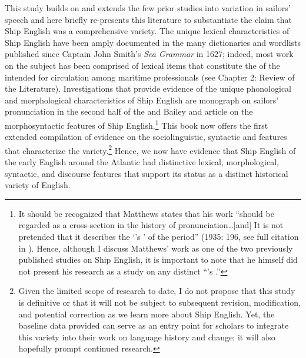 This study builds on and extends the few prior studies into variation in sailors’ speech and here briefly re-presents this literature to substantiate the claim that Ship English was a comprehensive variety. The unique lexical characteristics of Ship English have been amply documented in the many dictionaries and wordlists published since Captain John Smith’s \textit{Sea Grammar} in 1627; indeed, most work on the subject has been comprised of lexical items that constitute the  of the  intended for circulation among maritime professionals (see Chapter 2: Review of the Literature). Investigations that provide evidence of the unique phonological and morphological characteristics of Ship English are  monograph on sailors’ pronunciation in the second half of the  and Bailey and  article on the morphosyntactic features of Ship English.\footnote{It should be recognized that Matthews states that his work “should be regarded as a cross-section in the history of pronunciation…[and] It is not pretended that it describes the ‘’s ’ of the period” (1935: 196, see full citation in ). Hence, although I discuss Matthews’ work as one of the two previously published studies on Ship English, it is important to note that he himself did not present his research as a study on any distinct “’s .”}  This book now offers the first extended compilation of evidence on the sociolinguistic, syntactic and  features that characterize the variety.\footnote{Given the limited scope of research to date, I do not propose that this study is definitive or that it will not be subject to subsequent revision, modification, and potential correction as we learn more about Ship English. Yet, the baseline data provided can serve as an entry point for scholars to integrate this variety into their work on language history and change; it will also hopefully prompt continued research.}  Hence, we now have evidence that Ship English of the early English  around the Atlantic had distinctive lexical, morphological, syntactic, and discourse features that support its status as a distinct historical variety of English. 

